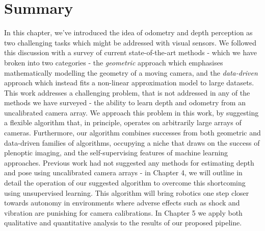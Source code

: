 \section{Summary}
In this chapter, we've introduced the idea of odometry and depth perception as two challenging tasks which might be addressed with visual sensors. We followed this discussion with a survey of current state-of-the-art methods - which we have broken into two categories - the \textit{geometric} approach which emphasises mathematically modelling the geometry of a moving camera, and the \textit{data-driven} approach which instead fits a non-linear approximation model to large datasets. This work addresses a challenging problem, that is not addressed in any of the methods we have surveyed - the ability to learn depth and odometry from an uncalibrated camera array. We approach this problem in this work, by suggesting a flexible algorithm that, in principle, operates on arbitrarily large arrays of cameras. Furthermore, our algorithm combines successes from both geometric and data-driven families of algorithms, occupying a niche that draws on the success of plenoptic imaging, and the self-supervising features of machine learning approaches. Previous work had not suggested any methods for estimating depth and pose using uncalibrated camera arrays - in Chapter 4, we will outline in detail the operation of our suggested algorithm to overcome this shortcoming using unsupervised learning. This algorithm will bring robotics one step closer towards autonomy in environments where adverse effects such as shock and vibration are punishing for camera calibrations. In Chapter 5 we apply both qualitative and quantitative analysis to the results of our proposed pipeline. 